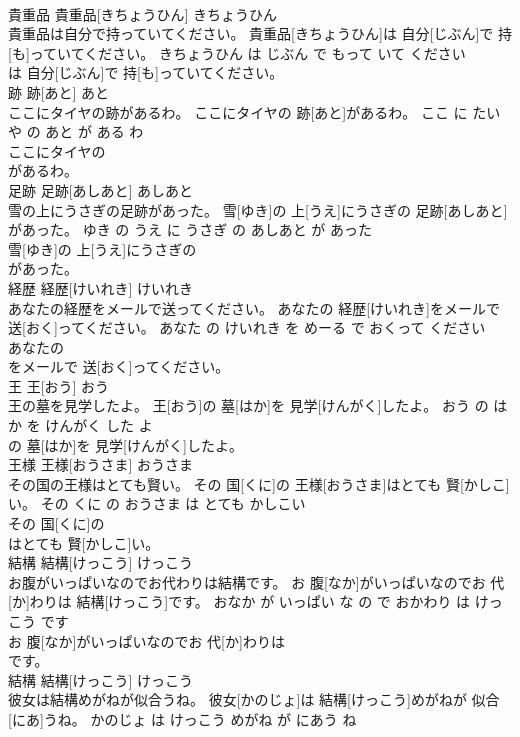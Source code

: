 \documentclass[8pt]{extreport}
\begin{document}
\begin{CJK}{UTF8}{min}
\\	貴重品	貴重品[きちょうひん]	きちょうひん	
\\	貴重品は自分で持っていてください。	貴重品[きちょうひん]は 自分[じぶん]で 持[も]っていてください。	きちょうひん は じぶん で もって いて ください	
\\	は 自分[じぶん]で 持[も]っていてください。			
\\	跡	跡[あと]	あと	
\\	ここにタイヤの跡があるわ。	ここにタイヤの 跡[あと]があるわ。	ここ に たいや の あと が ある わ	
\\	ここにタイヤの
\\	があるわ。			
\\	足跡	足跡[あしあと]	あしあと	
\\	雪の上にうさぎの足跡があった。	雪[ゆき]の 上[うえ]にうさぎの 足跡[あしあと]があった。	ゆき の うえ に うさぎ の あしあと が あった	
\\	雪[ゆき]の 上[うえ]にうさぎの
\\	があった。			
\\	経歴	経歴[けいれき]	けいれき	
\\	あなたの経歴をメールで送ってください。	あなたの 経歴[けいれき]をメールで 送[おく]ってください。	あなた の けいれき を めーる で おくって ください	
\\	あなたの
\\	をメールで 送[おく]ってください。			
\\	王	王[おう]	おう	
\\	王の墓を見学したよ。	王[おう]の 墓[はか]を 見学[けんがく]したよ。	おう の はか を けんがく した よ	
\\	の 墓[はか]を 見学[けんがく]したよ。			
\\	王様	王様[おうさま]	おうさま	
\\	その国の王様はとても賢い。	その 国[くに]の 王様[おうさま]はとても 賢[かしこ]い。	その くに の おうさま は とても かしこい	
\\	その 国[くに]の
\\	はとても 賢[かしこ]い。			
\\	結構	結構[けっこう]	けっこう	
\\	お腹がいっぱいなのでお代わりは結構です。	お 腹[なか]がいっぱいなのでお 代[か]わりは 結構[けっこう]です。	おなか が いっぱい な の で おかわり は けっこう です	
\\	お 腹[なか]がいっぱいなのでお 代[か]わりは
\\	です。			
\\	結構	結構[けっこう]	けっこう	
\\	彼女は結構めがねが似合うね。	彼女[かのじょ]は 結構[けっこう]めがねが 似合[にあ]うね。	かのじょ は けっこう めがね が にあう ね	

\end{CJK}
\end{document}
